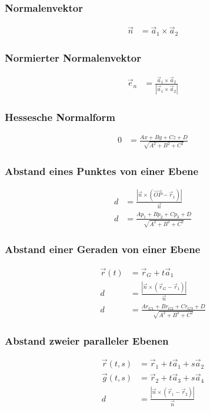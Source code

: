 \begin{multicols}{2}
\subsubsection*{Normalenvektor}
\begin{align*} 
\vec{n}&=\vec{a}_1\times\vec{a}_2
\end{align*}
\vfill
\subsubsection*{Normierter Normalenvektor}
\begin{align*} 
\vec{e}_n&=\frac{\vec{a}_1\times\vec{a}_2}{|\vec{a}_1\times\vec{a}_2|}
\end{align*}
\vfill
\end{multicols}

\begin{multicols}{2}
\subsubsection*{Hessesche Normalform}
\begin{align*} 
0&=\frac{Ax+By+Cz+D}{\sqrt{A^2+B^2+C^2}}
\end{align*}
\vfill
\subsubsection*{Abstand eines Punktes von einer Ebene}
\begin{align*} 
d&=\frac{|\vec{n}\times\left(\vec{OP}-\vec{r}_1\right)|}{\vec{n}}\\
d&=\frac{Ap_1+Bp_2+Cp_3+D}{\sqrt{A^2+B^2+C^2}}
\end{align*}
\vfill
\end{multicols}

\begin{multicols}{2}
\subsubsection*{Abstand einer Geraden von einer Ebene}
\begin{align*} 
\vec{r}(t) &=\vec{r}_G+t\vec{a}_1\\
d&=\frac{|\vec{n}\times\left(\vec{r}_G-\vec{r}_1\right)|}{\vec{n}}\\
d&=\frac{Ar_{G1}+Br_{G2}+Cr_{G3}+D}{\sqrt{A^2+B^2+C^2}}
\end{align*}
\vfill
\subsubsection*{Abstand zweier paralleler Ebenen}
\begin{align*} 
\vec{r}(t,s) &=\vec{r}_1+t\vec{a}_1+s\vec{a}_2\\
\vec{g}(t,s) &=\vec{r}_2+t\vec{a}_3+s\vec{a}_4\\
d&=\frac{|\vec{n}\times\left(\vec{r}_1-\vec{r}_2\right)|}{\vec{n}}
\end{align*}
\vfill
\end{multicols}

